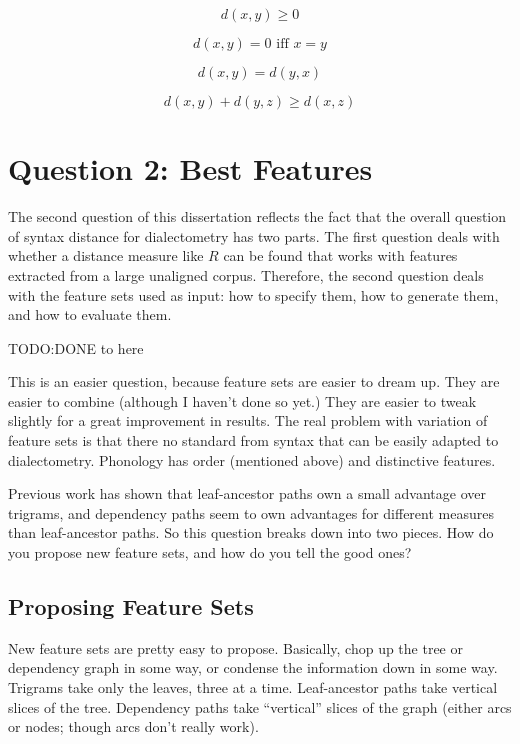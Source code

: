 \begin{equation}
  d(x,y) \ge 0
  \label{distance-properties-positive}
\end{equation}

\begin{equation}
 d(x,y) = 0 \textrm{ iff } x=y
\end{equation}

\begin{equation}
  d(x,y) = d(y,x)
\end{equation}

\begin{equation}
  d(x,y) + d(y,z) \ge d(x,z)
\label{distance-properties-triangle}
\end{equation}

\section{Question 2: Best Features}

The second question of this dissertation reflects the fact that the
overall question of syntax distance for dialectometry has two
parts. The first question deals with whether a distance measure like
$R$ can be found that works with features extracted from a
large unaligned corpus. Therefore, the second question deals with the
feature sets used as input: how to specify them, how to generate them,
and how to evaluate them.

TODO:DONE to here

This is an easier question, because feature sets are easier to dream
up. They are easier to combine (although I haven't done so yet.)
They are easier to tweak slightly for a great improvement in
results. The real problem with variation of feature sets is that there
no standard from syntax that can be easily adapted to
dialectometry. Phonology has order (mentioned above) and distinctive
features.

Previous work has shown that leaf-ancestor paths own a small advantage
over trigrams, and dependency paths seem to own advantages for
different measures than leaf-ancestor paths. So this question breaks
down into two pieces. How do you propose new feature sets, and how do
you tell the good ones?

\subsection{Proposing Feature Sets}

New feature sets are pretty easy to propose. Basically, chop up the
tree or dependency graph in some way, or condense the information down
in some way.  Trigrams take only the leaves, three at a
time. Leaf-ancestor paths take vertical slices of the tree. Dependency
paths take ``vertical'' slices of the graph (either arcs or nodes;
though arcs don't really work).

